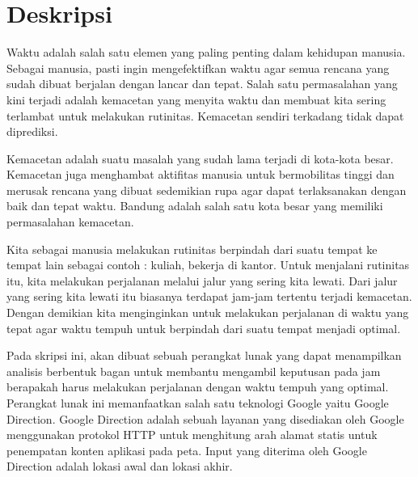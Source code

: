 \documentclass[a4paper,twoside]{article}
\begin{document}
\title{\@judultopik}
\author{\nama \textendash \@npm} 

\newcommand{\nama}{Frasetiawan Hidayat}
\newcommand{\@npm}{2010730121}
\newcommand{\@judultopik}{Analisis Waktu Tempuh Kota Bandung} %
\newcommand{\jumpemb}{1} %
\newcommand{\tanggal}{16/01/2017}
\maketitle


\section{Deskripsi}
Waktu adalah salah satu elemen yang paling penting dalam kehidupan manusia. Sebagai manusia, pasti ingin mengefektifkan waktu agar semua rencana yang sudah dibuat berjalan dengan lancar dan tepat. Salah satu permasalahan yang kini terjadi adalah kemacetan yang menyita waktu dan membuat kita sering terlambat untuk melakukan rutinitas. Kemacetan sendiri terkadang tidak dapat diprediksi.

Kemacetan adalah suatu masalah yang sudah lama terjadi di kota-kota besar. Kemacetan juga menghambat aktifitas manusia untuk bermobilitas tinggi dan merusak rencana yang dibuat sedemikian rupa agar dapat terlaksanakan dengan baik dan tepat waktu. Bandung adalah salah satu kota besar yang memiliki permasalahan kemacetan. 

Kita sebagai manusia melakukan rutinitas berpindah dari suatu tempat ke tempat lain sebagai contoh : kuliah, bekerja di kantor. Untuk menjalani rutinitas itu, kita melakukan perjalanan melalui jalur yang sering kita lewati. Dari jalur yang sering kita lewati itu biasanya terdapat jam-jam tertentu terjadi kemacetan. Dengan demikian kita menginginkan untuk melakukan perjalanan di waktu yang tepat agar waktu tempuh untuk berpindah dari suatu tempat menjadi optimal.

Pada skripsi ini, akan dibuat sebuah perangkat lunak yang dapat menampilkan analisis berbentuk bagan untuk membantu mengambil keputusan pada jam berapakah harus melakukan perjalanan dengan waktu tempuh yang optimal. Perangkat lunak ini memanfaatkan salah satu teknologi Google yaitu Google Direction. Google Direction adalah sebuah layanan yang disediakan oleh Google menggunakan protokol HTTP untuk menghitung arah alamat statis untuk penempatan konten aplikasi pada peta. Input yang diterima oleh Google Direction adalah lokasi awal dan lokasi akhir.
\end{document}
